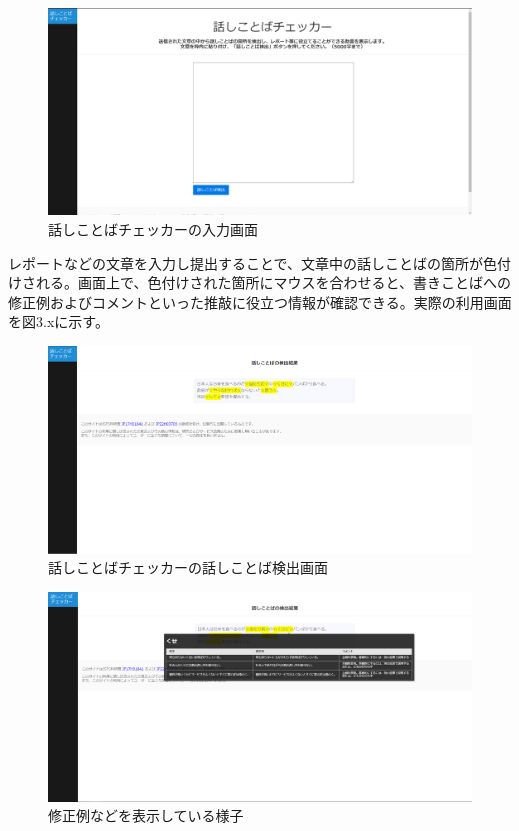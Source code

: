 \begin{figure}[H] %
	\centering
 	\includegraphics[width=150mm]{image/checkerss-plain.png}
	\caption{話しことばチェッカーの入力画面}
	\label{checkerss-plain}
\end{figure}

レポートなどの文章を入力し提出することで、文章中の話しことばの箇所が色付けされる。画面上で、色付けされた箇所にマウスを合わせると、書きことばへの修正例およびコメントといった推敲に役立つ情報が確認できる。実際の利用画面を図3.xに示す。

\begin{figure}[H]
	\centering
 	\includegraphics[width=150mm]{image/checkerss-result.png}
	\caption{話しことばチェッカーの話しことば検出画面}
	\label{checkerss-plain}
\end{figure}

\begin{figure}[H]
	\centering
 	\includegraphics[width=150mm]{image/checkerss-popout.png}
	\caption{修正例などを表示している様子}
	\label{checkerss-plain}
\end{figure}



